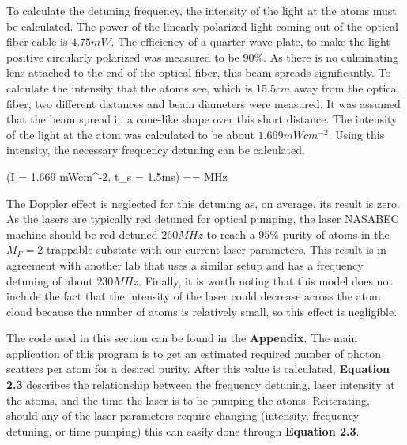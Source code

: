 To calculate the detuning frequency, the intensity of the light at the atoms must be calculated. The power of the linearly polarized light coming out of the optical fiber cable is $4.75 mW$. The efficiency of a quarter-wave plate, to make the light positive circularly polarized was measured to be $90\%$. As there is no culminating lens attached to the end of the optical fiber, this beam spreads significantly. To calculate the intensity that the atoms see, which is $15.5cm$ away from the optical fiber, two different distances and beam diameters were measured. It was assumed that the beam spread in a cone-like shape over this short distance. The intensity of the light at the atom was calculated to be about $1.669 mWcm^{-2}$. Using this intensity, the necessary frequency detuning can be calculated. 

\beq
\delta(I = 1.669 mWcm^{-2}, t_s = 1.5ms) =\Gamma =  MHz
\eeq

The Doppler effect is neglected for this detuning as, on average, its result is zero. As the lasers are typically red detuned for optical pumping, the laser NASABEC machine should be red detuned $260 MHz$ to reach a $95\%$ purity of atoms in the $M_F=2$ trappable substate with our current laser parameters. This result is in agreement with another lab that uses a similar setup and has a frequency detuning of about $230 MHz$. Finally, it is worth noting that this model does not include the fact that the intensity of the laser could decrease across the atom cloud because the number of atoms is relatively small, so this effect is negligible. 

The code used in this section can be found in the \textbf{Appendix}. The main application of this program is to get an estimated required number of photon scatters per atom for a desired purity. After this value is calculated, \textbf{Equation 2.3} describes the relationship between the frequency detuning, laser intensity at the atoms, and the time the laser is to be pumping the atoms. Reiterating, should any of the laser parameters require changing (intensity, frequency detuning, or time pumping) this can easily done through \textbf{Equation 2.3}. 

